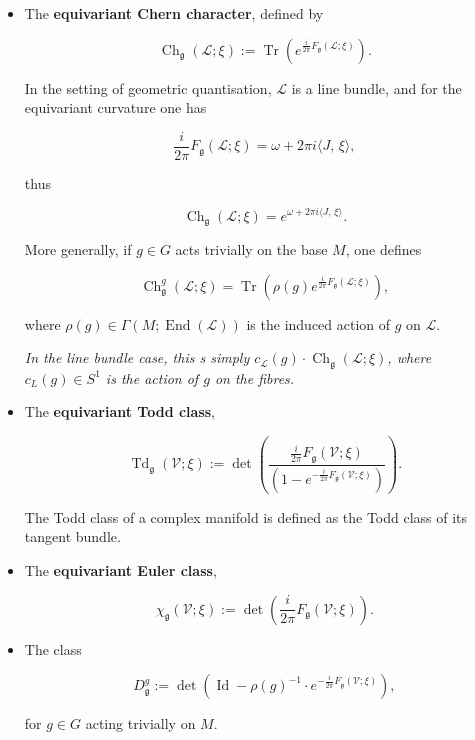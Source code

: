 \documentclass{article}
\newcommand{\w}{\omega}
\newcommand{\mcL}{\mathcal{L}}
\newcommand{\mfg}{\mathfrak{g}}
\newcommand{\mc}[1]{\mathcal{#1}}
\DeclareMathOperator{\End}{End}
\DeclareMathOperator{\Tr}{Tr}
\DeclareMathOperator{\Td}{Td}
\DeclareMathOperator{\Ch}{Ch}
\DeclareMathOperator{\Id}{Id}
\begin{document}
	\begin{itemize}
		\item The \textbf{equivariant Chern character}, defined by
		
		\begin{equation*}
			\Ch_{\mfg}(\mcL;\xi) := \Tr\left( e^{\tfrac{i}{2\pi} F_{\mfg}(\mcL;\xi) } \right).
		\end{equation*}
		
		In the setting of geometric quantisation, $\mcL$ is a line bundle, and for the equivariant curvature one has
		
		\begin{equation*}
			\frac{i}{2\pi} F_{\mfg}(\mcL;\xi) = \w + 2\pi i \langle J,\, \xi \rangle,
		\end{equation*}
	
		thus
	
		\begin{equation*}
			\Ch_{\mfg}(\mcL;\xi) = e^{\w + 2\pi i \langle J,\, \xi \rangle}.
		\end{equation*}
		
		
		More generally, if $g \in G$ acts trivially on the base $M$, one defines
		
		\begin{equation*}
			\Ch_{\mfg}^{g}(\mcL;\xi) = \Tr\left( \rho(g) e^{\tfrac{i}{2\pi} F_{\mfg}(\mcL;\xi) } \right),
		\end{equation*}
	
		where $\rho(g) \in \Gamma(M; \End(\mcL))$ is the induced action of $g$ on $\mcL$.
		
		\emph{In the line bundle case, this s simply $c_{\mcL}(g)\cdot \Ch_{\mfg}(\mcL;\xi)$, where $c_{L}(g) \in S^{1}$ is the action of $g$ on the fibres.}
		
		\item The \textbf{equivariant Todd class},
		
		\begin{equation*}
			\Td_{\mfg}(\mc{V}; \xi) := \det\left( \frac{ \tfrac{i}{2\pi} F_{\mfg}(\mc{V}; \xi)}{\left( 1 - e^{-\tfrac{i}{2\pi} F_{\mfg}(\mc{V}; \xi)} \right) } \right).
		\end{equation*}
	
		The Todd class of a complex manifold is defined as the Todd class of its tangent bundle.
		
		\item The \textbf{equivariant Euler class},
		
		\begin{equation*}
			\chi_{\mfg}(\mc{V}; \xi) := \det\left( \frac{i}{2 \pi} F_{\mfg}(\mc{V}; \xi)\right).
		\end{equation*}
	
		\item The class
		
		\begin{equation*}
			D_{\mfg}^{g} := \det\left( \Id - \rho(g)^{-1}\cdot e^{-\tfrac{i}{2\pi} F_{\mfg}(\mc{V}; \xi)} \right),
		\end{equation*}
	
		for $g \in G$ acting trivially on $M$.
	
	\end{itemize}
\end{document}
